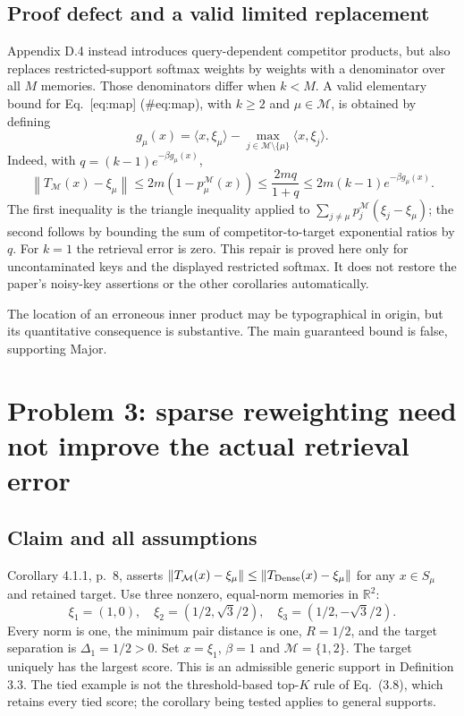 \documentclass[10pt]{article}
\begin{document}
\subsection*{Proof defect and a valid limited replacement}
Appendix D.4 instead introduces query-dependent competitor products, but also replaces restricted-support softmax weights by weights with a denominator over all \(M\) memories. Those denominators differ when \(k<M\). A valid elementary bound for Eq. [eq:map] (\#eq:map), with \(k\ge2\) and \(\mu\in\mathcal M\), is obtained by defining \[g_\mu(x)=\langle x,\xi_\mu\rangle-
       \max_{j\in\mathcal M\setminus\{\mu\}}\langle x,\xi_j\rangle.\] Indeed, with \(q=(k-1)e^{-\beta g_\mu(x)}\), \[\left\lVert T_\mathcal M(x)-\xi_\mu\right\rVert
 \le 2m(1-p^\mathcal M_\mu(x))
 \le \frac{2mq}{1+q}\le2m(k-1)e^{-\beta g_\mu(x)}.\] The first inequality is the triangle inequality applied to \(\sum_{j\ne\mu}p^\mathcal M_j(\xi_j-\xi_\mu)\); the second follows by bounding the sum of competitor-to-target exponential ratios by \(q\). For \(k=1\) the retrieval error is zero. This repair is proved here only for uncontaminated keys and the displayed restricted softmax. It does not restore the paper’s noisy-key assertions or the other corollaries automatically.\par
The location of an erroneous inner product may be typographical in origin, but its quantitative consequence is substantive. The main guaranteed bound is false, supporting Major.\par
\section*{Problem 3: sparse reweighting need not improve the actual retrieval error}
\subsection*{Claim and all assumptions}
Corollary 4.1.1, p. 8, asserts \(\left\lVert T_\mathcal M(x)-\xi_\mu\right\rVert\le\left\lVert T_{\rm Dense}(x)-\xi_\mu\right\rVert\) for any \(x\in S_\mu\) and retained target. Use three nonzero, equal-norm memories in \(\mathbb R^2\): \[\xi_1=(1,0),\quad
 \xi_2=(1/2,\sqrt3/2),\quad
 \xi_3=(1/2,-\sqrt3/2).\] Every norm is one, the minimum pair distance is one, \(R=1/2\), and the target separation is \(\Delta_1=1/2>0\). Set \(x=\xi_1\), \(\beta=1\) and \(\mathcal M=\{1,2\}\). The target uniquely has the largest score. This is an admissible generic support in Definition 3.3. The tied example is not the threshold-based top-\(K\) rule of Eq. (3.8), which retains every tied score; the corollary being tested applies to general supports.\par
\end{document}
